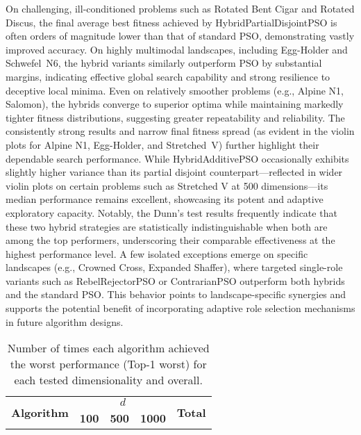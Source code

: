 {On challenging, ill-conditioned problems such as Rotated Bent Cigar and Rotated Discus, the final average best fitness achieved by HybridPartialDisjointPSO is often orders of magnitude lower than that of standard PSO, demonstrating vastly improved accuracy. On highly multimodal landscapes, including Egg-Holder and Schwefel~N6, the hybrid variants similarly outperform PSO by substantial margins, indicating effective global search capability and strong resilience to deceptive local minima. Even on relatively smoother problems (e.g., Alpine N1, Salomon), the hybrids converge to superior optima while maintaining markedly tighter fitness distributions, suggesting greater repeatability and reliability. The consistently strong results and narrow final fitness spread (as evident in the violin plots for Alpine N1, Egg-Holder, and Stretched~V) further highlight their dependable search performance.
While HybridAdditivePSO occasionally exhibits slightly higher variance than its partial disjoint counterpart---reflected in wider violin plots on certain problems such as Stretched V at 500 dimensions---its median performance remains excellent, showcasing its potent and adaptive exploratory capacity. Notably, the Dunn’s test results frequently indicate that these two hybrid strategies are statistically indistinguishable when both are among the top performers, underscoring their comparable effectiveness at the highest performance level.
A few isolated exceptions emerge on specific landscapes (e.g., Crowned Cross, Expanded Shaffer), where targeted single-role variants such as RebelRejectorPSO or ContrarianPSO outperform both hybrids and the standard PSO. This behavior points to landscape-specific synergies and supports the potential benefit of incorporating adaptive role selection mechanisms in future algorithm designs.





\begin{longtable}[c]{p{5cm}cccc}
\caption[Frequency of worst results by algorithm and dimension]{Number of times each algorithm achieved the worst performance (Top-1 worst) for each tested dimensionality and overall.}
\label{tab:algo-worst1-counts} \\
\toprule
\multirow{2}{*}{\textbf{Algorithm}} & \multicolumn{3}{c}{$d$} & \multirow{2}{*}{\textbf{Total}}  \\
\cmidrule(lr){2-4}
 & \textbf{100} & \textbf{500} & \textbf{1000} \\ \midrule
\endfirsthead


\end{longtable}}
